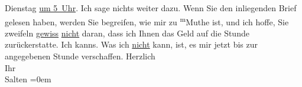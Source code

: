 \begin{ledgroupsized}[t]{13cm}
                  Dienstag{ }{\pb}\uline{um 5 Uhr}. Ich sage nichts weiter dazu. Wenn Sie den inliegenden Brief gelesen haben,
               werden Sie begreifen, wie mir zu \substVorne{}\textsuperscript{m}\substDazwischen{}M\substHinten{}uthe ist, und ich hoffe, Sie zweifeln \uline{gewiss}{ }\uline{nicht} daran, dass ich Ihnen das Geld auf die Stunde
               zurückerstatte. Ich kanns. Was ich \uline{nicht} kann, ist,
               es mir jetzt bis zur angegebenen Stunde verschaffen.\pend
           \pstart
           Herzlich {\\[\baselineskip]}Ihr {\\[\baselineskip]}\spacefill\mbox{Salten}\pend
           \leftskip=0em{}
         
         \endnumbering{}\end{ledgroupsized}  \newcommand{\dateiname}{L03168}\newcommand{\titel}{Felix Salten an Arthur Schnitzler, [zwischen 12. – 29. 2. 1896]}\newcommand{\editorInnen}{Martin Anton Müller und Laura Untner}
      